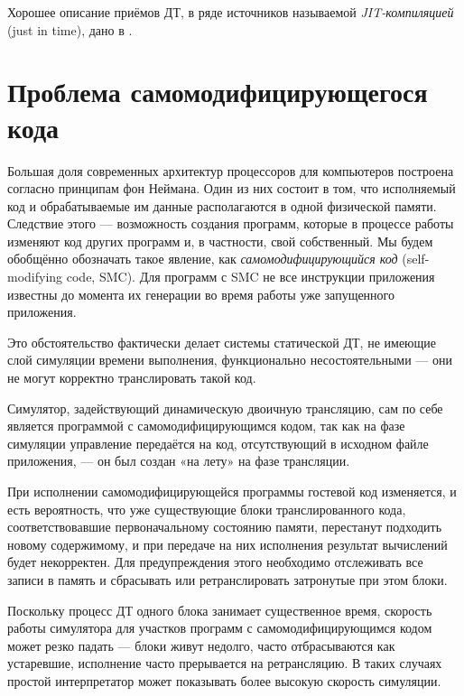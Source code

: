 Хорошее описание приёмов ДТ, в ряде источников называемой \textit{JIT-компиляцией} (\abbr just in time), дано в \cite{TophamJones2007}.


% 

\section{Проблема самомодифицирующегося кода}\label{sec:smc}

Большая доля современных архитектур процессоров для компьютеров построена согласно принципам фон Неймана. Один из них состоит в том, что исполняемый код и обрабатываемые им данные располагаются в одной физической памяти. Следствие этого — возможность создания программ, которые в процессе работы изменяют код других программ и, в частности, свой собственный. Мы будем обобщённо обозначать такое явление, как \textit{самомодифицирующийся код} (\abbr self-modifying code, SMC). Для программ с SMC не все инструкции приложения известны до момента их генерации во время работы уже запущенного приложения.

Это обстоятельство фактически делает системы статической ДТ, не имеющие слой симуляции времени выполнения, функционально несостоятельными — они не могут корректно транслировать такой код.

\begin{digression}
Симулятор, задействующий динамическую двоичную трансляцию, сам по себе является программой с самомодифицирующимся кодом, так как на фазе симуляции управление передаётся на код, отсутствующий в исходном файле приложения, — он был создан «на лету» на фазе трансляции.
\end{digression}

При исполнении самомодифицирующейся программы гостевой код изменяется, и есть вероятность, что уже существующие блоки транслированного кода, соответствовавшие первоначальному состоянию памяти, перестанут подходить новому содержимому, и при передаче на них исполнения результат вычислений будет некорректен.  Для предупреждения этого необходимо отслеживать все записи в память и сбрасывать или ретранслировать затронутые при этом блоки. 

Поскольку процесс ДТ одного блока занимает существенное время, скорость работы симулятора для участков программ с самомодифицирующимся кодом  может резко падать — блоки живут недолго, часто отбрасываются как устаревшие, исполнение часто прерывается на ретрансляцию. В таких случаях простой интерпретатор может показывать более высокую скорость симуляции.

